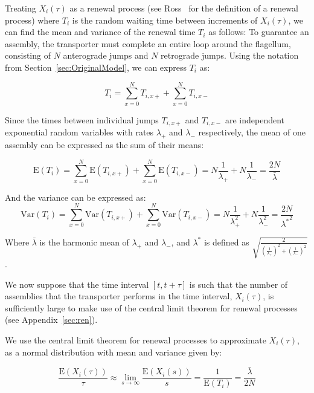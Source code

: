 \documentclass[titlepage]{article}
\newcommand{\var}{\textrm{Var}}
\newcommand{\E}{\textrm{E}}
\begin{document}
Treating $X_i(\tau)$ as a renewal process (see Ross~\cite{ross} for the definition of a renewal process) where $T_i$ is the random waiting time between increments of $X_i(\tau)$, we can find the mean and variance of the renewal time $T_i$ as follows:
To guarantee an assembly, the transporter must complete an entire loop around the flagellum, consisting of $N$ anterograde jumps and $N$ retrograde jumps. Using the notation from Section~\ref{sec:OriginalModel}, we can express $T_i$ as:

\begin{equation*}
T_i = \sum_{x=0}^N{T_{i,x+}} + \sum_{x=0}^N{T_{i,x-}}
\end{equation*}

Since the times between individual jumps $T_{i,x+}$ and $T_{i,x-}$ are independent exponential random variables with rates $\lambda_+$ and $\lambda_-$ respectively, the mean of one assembly can be expressed as the sum of their means:

\begin{equation*}
\E(T_i) = \sum_{x=0}^N{\E(T_{i,x+})} + \sum_{x=0}^N{\E(T_{i,x-})} = N \frac{1}{\lambda_+} + N \frac{1}{\lambda_-} = \frac{2N}{\bar{\lambda}}
\end{equation*}

And the variance can be expressed as:
\begin{equation*}
\var(T_i) = \sum_{x=0}^N{\var(T_{i,x+})} + \sum_{x=0}^N{\var(T_{i,x-})} = N \frac{1}{\lambda_+^2} + N \frac{1}{\lambda_-^2} = \frac{2N}{{\lambda^*}^2}
\end{equation*}

Where $\bar{\lambda}$ is the harmonic mean of $\lambda_+$ and $\lambda_-$, and $\lambda^*$ is defined as $\sqrt{\frac{2}{(\frac{1}{\lambda_+})^2+(\frac{1}{\lambda_-})^2}}$.

We now suppose that the time interval $[t,t+\tau]$ is such that the number of assemblies that the transporter performs in the time interval, $X_i(\tau)$, is sufficiently large to make use of the central limit theorem for renewal processes (see Appendix~\ref{sec:ren}).

We use the central limit theorem for renewal processes to approximate $X_i(\tau)$, as a normal distribution with mean and variance given by:

\begin{equation*}
\frac{\E(X_i(\tau))}{\tau}
\approx \lim_{s \to \infty}\frac{\E(X_i(s))}{s}
= \frac{1}{\E(T_i)}
= \frac{\bar{\lambda}}{2N}
\end{equation*}
\end{document}
